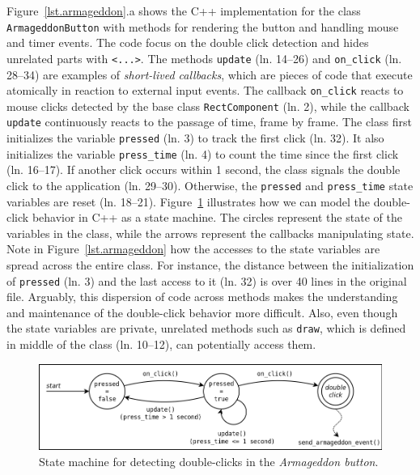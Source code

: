 \documentclass{vgtc}                          %
\newcommand{\code}[1] {{\small{\texttt{#1}}}}
\begin{document}
Figure~\ref{lst.armageddon}.a shows the C++ implementation for the class
\code{ArmageddonButton} with methods for rendering the button and handling
mouse and timer events.
The code focus on the double click detection and hides unrelated parts with
\code{<...>}.
%
The methods \code{update} (ln. 14--26) and \code{on\_click} (ln. 28--34) are
examples of \emph{short-lived callbacks}, which are pieces of code that execute
atomically in reaction to external input events.
The callback \code{on\_click} reacts to mouse clicks detected by the base class
\code{RectComponent} (ln. 2), while the callback \code{update} continuously
reacts to the passage of time, frame by frame.
%
The class first initializes the variable \code{pressed} (ln. 3) to track the
first click (ln. 32).
It also initializes the variable \code{press\_time} (ln. 4) to count the time
since the first click (ln. 16--17).
If another click occurs within 1 second, the class signals the double click to
the application (ln. 29--30).
Otherwise, the \code{pressed} and \code{press\_time} state variables are reset
(ln. 18--21). 
%
Figure~\ref{fig.armageddon.fsm} illustrates how we can model the double-click 
behavior in C++ as a state machine.
The circles represent the state of the variables in the class, while the arrows 
represent the callbacks manipulating state.
%
Note in Figure~\ref{lst.armageddon} how the accesses to the state variables are
spread across the entire class.
For instance, the distance between the initialization of \code{pressed} (ln.
3) and the last access to it (ln. 32) is over 40 lines in the original file.
Arguably, this dispersion of code across methods makes the understanding and 
maintenance of the double-click behavior more difficult.
Also, even though the state variables are private, unrelated methods such as 
\code{draw}, which is defined in middle of the class (ln. 10--12), can
potentially access them.

\begin{figure}[t]
\centering
\includegraphics[width=\columnwidth]{double-click}
\caption{State machine for detecting double-clicks in the
         \emph{Armageddon button}.
\label{fig.armageddon.fsm}
}
\end{figure}
\end{document}
